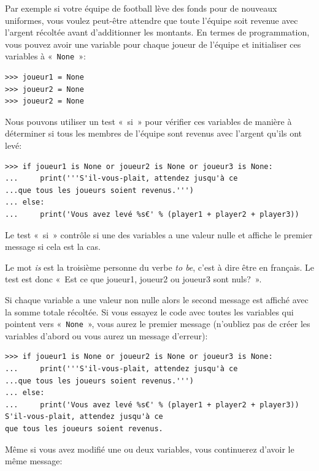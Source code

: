 Par exemple si votre équipe de football lève des fonds pour de nouveaux uniformes, vous voulez peut-être attendre que toute l'équipe soit revenue avec l'argent récoltée avant d'ad\-di\-tion\-ner les montants. En termes de programmation, vous pouvez avoir une variable pour chaque joueur de l'équipe et initialiser ces variables à «~\texttt{None}~»:

\begin{Verbatim}[frame=single,rulecolor=\color{mbleu}, label=à taper]
>>> joueur1 = None
>>> joueur2 = None
>>> joueur2 = None
\end{Verbatim}

Nous pouvons utiliser un test «~si~» pour vérifier ces variables de manière à déterminer si tous les membres de l'équipe sont revenus avec l'argent qu'ils ont levé:

\begin{Verbatim}[frame=single,rulecolor=\color{green}, label=à taper avec attention]
>>> if joueur1 is None or joueur2 is None or joueur3 is None:
...     print('''S'il-vous-plait, attendez jusqu'à ce 
...que tous les joueurs soient revenus.''')
... else:
...     print('Vous avez levé %s€' % (player1 + player2 + player3))
\end{Verbatim}

Le test «~si~» contrôle si une des variables a une valeur nulle et affiche le premier message si cela est la cas.

Le mot \emph{is} est la troisième personne du verbe \emph{to be}, c'est à dire être en français. Le test est donc «~Est ce que joueur1, joueur2 ou joueur3 sont nuls?~». 

Si chaque variable a une valeur non nulle alors le second message est affiché avec la somme totale récoltée.
Si vous essayez le code avec toutes les variables qui pointent vers «~\texttt{None}~»,  vous aurez le premier message (n'oubliez pas de créer les variables d'abord ou vous aurez un message d'erreur):

\begin{Verbatim}[frame=single,rulecolor=\color{green}, label=à taper avec attention]
>>> if joueur1 is None or joueur2 is None or joueur3 is None:
...     print('''S'il-vous-plait, attendez jusqu'à ce 
...que tous les joueurs soient revenus.''')
... else:
...     print('Vous avez levé %s€' % (player1 + player2 + player3))
S'il-vous-plait, attendez jusqu'à ce 
que tous les joueurs soient revenus.
\end{Verbatim}

Même si vous avez modifié une ou deux variables, vous continuerez d'avoir le même message:

